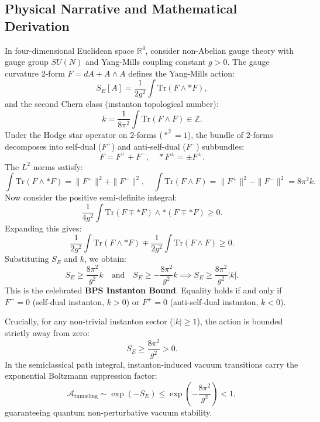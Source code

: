 \documentclass[11pt,a4paper]{article}
\begin{document}
\subsection{Physical Narrative and Mathematical Derivation}
In four-dimensional Euclidean space $\mathbb{R}^4$, consider non-Abelian gauge theory with gauge group $SU(N)$ and Yang-Mills coupling constant $g > 0$. The gauge curvature 2-form $F = dA + A \wedge A$ defines the Yang-Mills action:
\begin{equation}
    S_E[A] = \frac{1}{2g^2} \int \mathrm{Tr}(F \wedge *F),
\end{equation}
and the second Chern class (instanton topological number):
\begin{equation}
    k = \frac{1}{8\pi^2} \int \mathrm{Tr}(F \wedge F) \in \mathbb{Z}.
\end{equation}
Under the Hodge star operator on 2-forms ($*^2 = 1$), the bundle of 2-forms decomposes into self-dual ($F^+$) and anti-self-dual ($F^-$) subbundles:
\begin{equation}
    F = F^+ + F^-, \quad *F^\pm = \pm F^\pm.
\end{equation}
The $L^2$ norms satisfy:
\begin{equation}
    \int \mathrm{Tr}(F \wedge *F) = \|F^+\|^2 + \|F^-\|^2, \quad \int \mathrm{Tr}(F \wedge F) = \|F^+\|^2 - \|F^-\|^2 = 8\pi^2 k.
\end{equation}
Now consider the positive semi-definite integral:
\begin{equation}
    \frac{1}{4g^2} \int \mathrm{Tr}(F \mp *F) \wedge *(F \mp *F) \ge 0.
\end{equation}
Expanding this gives:
\begin{equation}
    \frac{1}{2g^2} \int \mathrm{Tr}(F \wedge *F) \mp \frac{1}{2g^2} \int \mathrm{Tr}(F \wedge F) \ge 0.
\end{equation}
Substituting $S_E$ and $k$, we obtain:
\begin{equation}
    S_E \ge \frac{8\pi^2}{g^2} k \quad \text{and} \quad S_E \ge -\frac{8\pi^2}{g^2} k \implies S_E \ge \frac{8\pi^2}{g^2} |k|.
\end{equation}
This is the celebrated \textbf{BPS Instanton Bound}. Equality holds if and only if $F^- = 0$ (self-dual instanton, $k > 0$) or $F^+ = 0$ (anti-self-dual instanton, $k < 0$).

Crucially, for any non-trivial instanton sector ($|k| \ge 1$), the action is bounded strictly away from zero:
\begin{equation}
    S_E \ge \frac{8\pi^2}{g^2} > 0.
\end{equation}
In the semiclassical path integral, instanton-induced vacuum transitions carry the exponential Boltzmann suppression factor:
\begin{equation}
    \mathcal{A}_{\mathrm{tunneling}} \sim \exp(-S_E) \le \exp\left(-\frac{8\pi^2}{g^2}\right) < 1,
\end{equation}
guaranteeing quantum non-perturbative vacuum stability.
\end{document}
